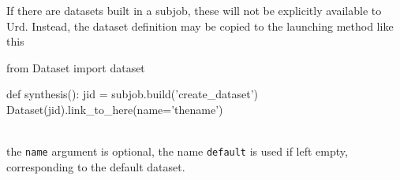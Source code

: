 If there are datasets built in a subjob, these will not be explicitly
available to Urd.  Instead, the dataset definition may be copied to
the launching method like this
\\
\begin{python}
from Dataset import dataset

def synthesis():
  jid = subjob.build('create_dataset')
  Dataset(jid).link_to_here(name='thename')
\end{python}
\\
the \texttt{name} argument is optional, the name \texttt{default} is
used if left empty, corresponding to the default dataset.
